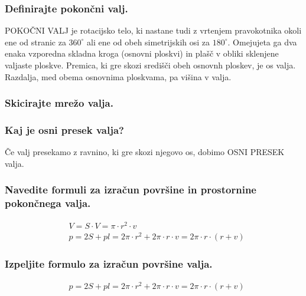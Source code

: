 \documentclass{article}
\begin{document}
\subsubsection*{Definirajte pokončni valj.}

POKOČNI VALJ je rotacijsko telo, ki nastane tudi z vrtenjem pravokotnika okoli ene od stranic za $360^{\circ}$ ali ene od obeh simetrijskih osi za $180^{\circ}$. Omejujeta ga dva enaka vzporedna skladna kroga (osnovni ploskvi) in plašč v obliki sklenjene valjaste ploskve. Premica, ki gre skozi središči obeh osnovnh ploskev, je os valja. Razdalja, med obema osnovnima ploskvama, pa višina v valja.

\subsubsection*{Skicirajte mrežo valja.}


\subsubsection*{Kaj je osni presek valja?}

Če valj presekamo z ravnino, ki gre skozi njegovo os, dobimo OSNI PRESEK valja.

\subsubsection*{Navedite formuli za izračun površine in prostornine pokončnega valja.}

$$
\begin{aligned}
& V=S \cdot V=\pi \cdot r^{2} \cdot v \\
& p=2 S+p l=2 \pi \cdot r^{2}+2 \pi \cdot r \cdot v=2 \pi \cdot r \cdot(r+v)
\end{aligned}
$$

\subsubsection*{Izpeljite formulo za izračun površine valja.}

$$
\begin{aligned}
& p=2 S+p l=2 \pi \cdot r^{2}+2 \pi \cdot r \cdot v=2 \pi \cdot r \cdot(r+v)
\end{aligned}
$$
\end{document}
